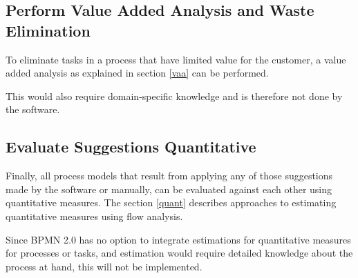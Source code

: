 \subsection{Perform Value Added Analysis and Waste Elimination}
To eliminate tasks in a process that have limited value for the customer, a value added analysis as explained in section \ref{vaa} can be performed.  

This would also require domain-specific knowledge and is therefore not done by the software. 

\subsection{Evaluate Suggestions Quantitative}
Finally, all process models that result from applying any of those suggestions made by the software or manually, can be evaluated against each other using quantitative measures. The section \ref{quant} describes approaches to estimating quantitative measures using flow analysis. 

Since BPMN 2.0 has no option to integrate estimations for quantitative measures for processes or tasks, and estimation would require detailed knowledge about the process at hand, this will not be implemented.

